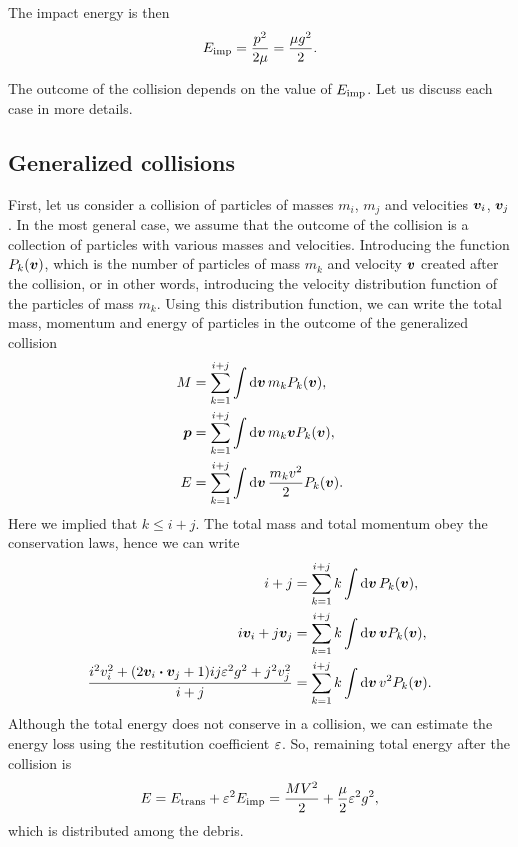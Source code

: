 \documentclass[aps,prl,preprint,groupedaddress,10pt]{revtex4-2}
\begin{document}
The impact energy is then
\begin{equation}
    E_{\mathrm{imp}}=\frac{p^2}{2\mu}=\frac{\mu g^2}{2}.
\end{equation}

The outcome of the collision depends on the value of $E_{\mathrm{imp}}$. Let us discuss each 
case in more details.

\subsection{Generalized collisions}
First, let us consider a collision of particles of masses $m_i$, $m_j$ and 
velocities $\vb*{v}_i$, $\vb*{v}_j$. In the most general case, we assume that
the outcome of the collision is a collection of particles with various masses and 
velocities. Introducing the function $P_k\pqty{\bv}$, which is the number of 
particles of mass $m_k$ and velocity $\vb*{v}$ created after the collision, 
or in other words, introducing the velocity distribution function of the particles of 
mass $m_k$. Using this distribution function, we can write the total mass, momentum and 
energy of particles in the outcome of the generalized collision
\begin{equation}
    \begin{split}
        M &= \sum_{k=1}^{i+j}\int\dd{\bv}m_kP_k\pqty{\bv},\\
        \bp &= \sum_{k=1}^{i+j}\int\dd{\bv}m_k\bv P_k\pqty{\bv},\\
        E &= \sum_{k=1}^{i+j}\int\dd{\bv}\frac{m_kv^2}{2}P_k\pqty{\bv}.
    \end{split}
\end{equation}
Here we implied that $k\leqslant i+j$. The total mass and total momentum obey the 
conservation laws, hence we can write
\begin{equation}
    \begin{split}
        i+j &= \sum_{k=1}^{i+j}k\int\dd{\bv}P_k\pqty{\bv},\\
        i\bv_i+j\bv_j &= \sum_{k=1}^{i+j}k\int\dd{\bv}\bv P_k\pqty{\bv},\\
        \frac{i^2v_i^2+\pqty{2\bv_i\vdot\bv_j+1}ij\eps^2g^2+j^2v_j^2}{i+j} &= 
        \sum_{k=1}^{i+j}k\int\dd{\bv}v^2P_k\pqty{\bv}.
    \end{split}
\end{equation}
Although the total energy does not conserve in a collision, we can estimate the energy 
loss using the restitution coefficient $\varepsilon$. So, remaining total energy after the 
collision is 
\begin{equation}
    E=E_{\mathrm{trans}}+\varepsilon^2E_{\mathrm{imp}}=\frac{MV^2}{2}+\frac{\mu}{2}\varepsilon^2g^2,
\end{equation}
which is distributed among the debris. 
\end{document}
